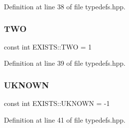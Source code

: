 Definition at line 38 of file typedefs.\+hpp.

\mbox{\label{namespace_e_x_i_s_t_s_ad76d02e8eb6d20715d333b72394b0648}} 
\subsubsection{\texorpdfstring{T\+WO}{TWO}}
{\footnotesize\ttfamily const int E\+X\+I\+S\+T\+S\+::\+T\+WO = 1}



Definition at line 39 of file typedefs.\+hpp.

\mbox{\label{namespace_e_x_i_s_t_s_a81eb362d951445c658942a433afddb97}} 
\subsubsection{\texorpdfstring{U\+K\+N\+O\+WN}{UKNOWN}}
{\footnotesize\ttfamily const int E\+X\+I\+S\+T\+S\+::\+U\+K\+N\+O\+WN = -\/1}



Definition at line 41 of file typedefs.\+hpp.

